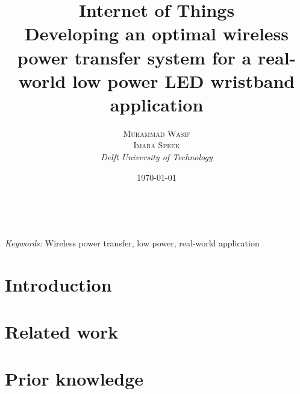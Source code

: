 \documentclass[a4paper, 10pt]{article}
\title{\textbf{Internet of Things }\\ %
Developing an optimal wireless power transfer system for a real-world low power LED wristband application} %
\author{\textsc{Muhammad Wasif \\
Imara Speek} %
\\{\textit{Delft University of Technology}}} %
\date{\today} %
\makeatletter
\renewcommand{\maketitle}{ %
\begin{flushright} %
{\LARGE\@title} %

\vspace{50pt} %

{\large\@author} %
\\\@date %


\vspace{40pt} %
\end{flushright}
}
\makeatother
\begin{document}
\maketitle %



\begin{abstract}
\end{abstract}

\hspace*{3,6mm}\textit{Keywords:} Wireless power transfer, low power, real-world application %

\vspace{30pt} %


\section{Introduction}
\label{sec:intro}




\section{Related work}
\label{sec:related}




\section{Prior knowledge}
\label{sec:prior}

\end{document}

